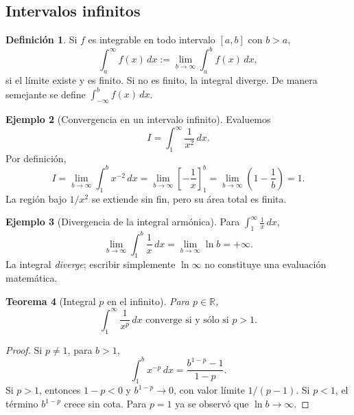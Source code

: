 \documentclass[12pt]{article}
\newtheorem{teorema}{Teorema}[section]
\theoremstyle{definition}
\newtheorem{definicion}[teorema]{Definición}
\newtheorem{ejemplo}[teorema]{Ejemplo}
\theoremstyle{remark}
\newcommand{\R}{\mathbb{R}}
\newcommand{\dd}{\,dx}
\begin{document}
\subsection*{Intervalos infinitos}
\begin{definicion}
Si $f$ es integrable en todo intervalo $[a,b]$ con $b>a$,
\[\boxed{\int_a^{\infty} f(x)\dd:=\lim_{b\to\infty}\int_a^b f(x)\dd,}\]
si el límite existe y es finito. Si no es finito, la integral diverge. De manera semejante se define $\int_{-\infty}^{b}f(x)\dd$.
\end{definicion}
\begin{ejemplo}[Convergencia en un intervalo infinito]
Evaluemos
\[I=\int_1^\infty\frac{1}{x^2}\dd.
\]
Por definición,
\[I=\lim_{b\to\infty}\int_1^b x^{-2}\dd
=\lim_{b\to\infty}\left[-\frac1x\right]_1^b
=\lim_{b\to\infty}\left(1-\frac1b\right)=\boxed{1}.\]
La región bajo $1/x^2$ se extiende sin fin, pero su área total es finita.
\end{ejemplo}
\begin{ejemplo}[Divergencia de la integral armónica]
Para $\int_1^\infty\frac1x\dd$, 
\[\lim_{b\to\infty}\int_1^b\frac1x\dd
=\lim_{b\to\infty}\ln b=+\infty.\]
La integral \emph{diverge}; escribir simplemente $\ln\infty$ no constituye una evaluación matemática.
\end{ejemplo}
\begin{teorema}[Integral $p$ en el infinito]
Para $p\in\R$,
\[\boxed{\int_1^\infty\frac{1}{x^p}\dd\text{ converge si y sólo si }p>1.}\]
\end{teorema}
\begin{proof}
Si $p\ne1$, para $b>1$,
\[\int_1^b x^{-p}\dd=\frac{b^{1-p}-1}{1-p}.\]
Si $p>1$, entonces $1-p<0$ y $b^{1-p}\to0$, con valor límite $1/(p-1)$. Si $p<1$, el término $b^{1-p}$ crece sin cota. Para $p=1$ ya se observó que $\ln b\to\infty$.
\end{proof}
\end{document}
